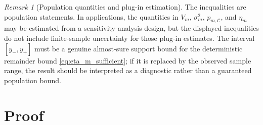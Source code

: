 \documentclass[11pt,letterpaper]{article}
\theoremstyle{remark}
\newtheorem*{remark}{Remark}
\begin{document}
\begin{remark}[Population quantities and plug-in estimation]
The inequalities are population statements. In applications, the quantities in
$V_m$, $\sigma_m^2$, $p_{m,\mathscr C}$, and $\eta_m$ may be estimated from a
sensitivity-analysis design, but the displayed inequalities do not include
finite-sample uncertainty for those plug-in estimates. The interval
$[y_-,y_+]$ must be a genuine almost-sure support bound for the deterministic
remainder bound \eqref{eq:eta_m_sufficient}; if it is replaced by the observed
sample range, the result should be interpreted as a diagnostic rather than a
guaranteed population bound.
\end{remark}

\section{Proof}
\label{sec:proof}
\end{document}
